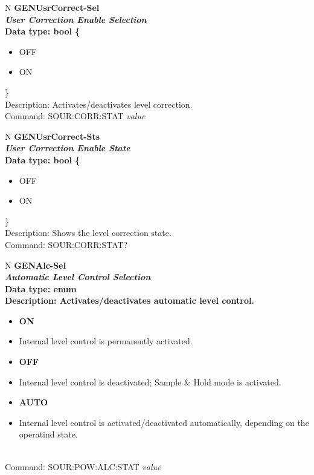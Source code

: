 \documentclass[openany]{article}
\begin{document}
%
		\begin{tabular}{N}
			\hline
			\bfseries GENUsrCorrect-Sel \\ \hline
			\emph{User Correction Enable Selection} \\
			Data type: bool \{\begin{itemize}[noitemsep]
				\small
				\item[] OFF
				\item[] ON
			\end{itemize}\} \\
			Description: Activates/deactivates level correction. \\
			Command: SOUR:CORR:STAT \emph{value} \\

		\end{tabular}


		\begin{tabular}{N}
			\hline
			\bfseries GENUsrCorrect-Sts \\ \hline
			\emph{User Correction Enable State} \\
			Data type: bool \{\begin{itemize}[noitemsep]
				\small
				\item[] OFF
				\item[] ON
			\end{itemize}\} \\
			Description: Shows the level correction state. \\
			Command: SOUR:CORR:STAT? \\

		\end{tabular}
%
		\begin{tabular}{N}
			\hline
			\bfseries GENAlc-Sel \\ \hline
			\emph{Automatic Level Control Selection} \\
			Data type: enum \\
			Description: Activates/deactivates automatic level control. \begin{itemize}[noitemsep]
				\small
				\item[] \textbf{ON}
				\item[] Internal level control is permanently activated.
				\item[] \textbf{OFF}
				\item[] Internal level control is deactivated; Sample & Hold mode is activated.
				\item[] \textbf{AUTO}
				\item[] Internal level control is activated/deactivated automatically, depending on the operatind state.
			\end{itemize} \\
			Command: SOUR:POW:ALC:STAT \emph{value} \\

		\end{tabular}
\end{document}
